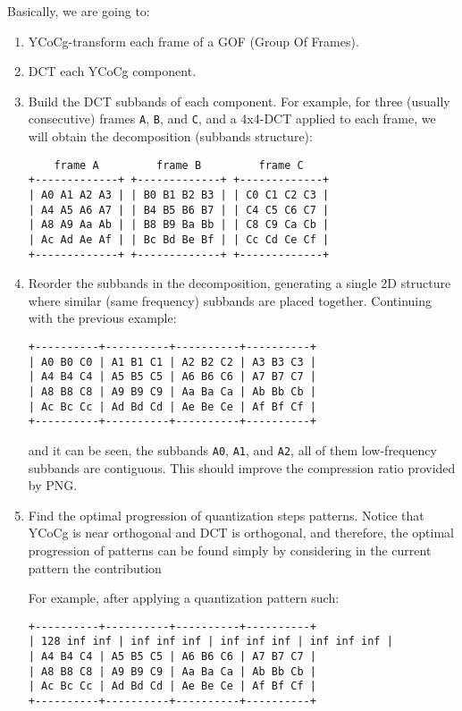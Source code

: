 Basically, we are going to:
\begin{enumerate}
\item YCoCg-transform each frame of a GOF (Group Of Frames).
\item DCT each YCoCg component.
\item Build the DCT subbands of each component. For example, for three
  (usually consecutive) frames \verb|A|, \verb|B|, and \verb|C|, and a
  4x4-DCT applied to each frame, we will obtain the decomposition
  (subbands structure):
\begin{verbatim}
    frame A         frame B         frame C
+-------------+ +-------------+ +-------------+
| A0 A1 A2 A3 | | B0 B1 B2 B3 | | C0 C1 C2 C3 |
| A4 A5 A6 A7 | | B4 B5 B6 B7 | | C4 C5 C6 C7 |
| A8 A9 Aa Ab | | B8 B9 Ba Bb | | C8 C9 Ca Cb |
| Ac Ad Ae Af | | Bc Bd Be Bf | | Cc Cd Ce Cf |
+-------------+ +-------------+ +-------------+
\end{verbatim}
\item Reorder the subbands in the decomposition, generating a single
  2D structure where similar (same frequency) subbands are placed
  together. Continuing with the previous example:
\begin{verbatim}
+----------+----------+----------+----------+
| A0 B0 C0 | A1 B1 C1 | A2 B2 C2 | A3 B3 C3 |
| A4 B4 C4 | A5 B5 C5 | A6 B6 C6 | A7 B7 C7 |
| A8 B8 C8 | A9 B9 C9 | Aa Ba Ca | Ab Bb Cb |
| Ac Bc Cc | Ad Bd Cd | Ae Be Ce | Af Bf Cf |
+----------+----------+----------+----------+
\end{verbatim}
  and it can be seen, the subbands \verb|A0|, \verb|A1|, and
  \verb|A2|, all of them low-frequency subbands are contiguous. This
  should improve the compression ratio provided by PNG.
\item Find the optimal progression of quantization steps patterns. Notice that YCoCg is near orthogonal and DCT is orthogonal, and therefore, the optimal progression of patterns can be found simply by considering in the current pattern the contribution 

  For
  example, after applying a quantization pattern such:
\begin{verbatim}
+----------+----------+----------+----------+
| 128 inf inf | inf inf inf | inf inf inf | inf inf inf |
| A4 B4 C4 | A5 B5 C5 | A6 B6 C6 | A7 B7 C7 |
| A8 B8 C8 | A9 B9 C9 | Aa Ba Ca | Ab Bb Cb |
| Ac Bc Cc | Ad Bd Cd | Ae Be Ce | Af Bf Cf |
+----------+----------+----------+----------+
\end{verbatim}
\end{enumerate}

